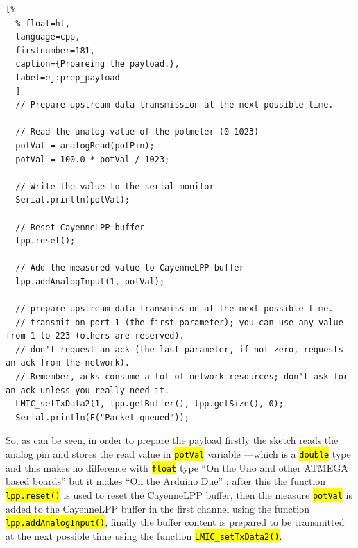 \documentclass[11pt,a4paper,dvipsnames,twoside]{article}
\newcommand{\doubt}[1] {\textbf{\color{Red3}#1}}
\newcommand{\cmd}[1] {\hl{\texttt{#1}}}
\begin{document}
\begin{lstlisting}[%
  % float=ht,
  language=cpp,
  firstnumber=181,
  caption={Prpareing the payload.},
  label=ej:prep_payload
  ]
  // Prepare upstream data transmission at the next possible time.
        
  // Read the analog value of the potmeter (0-1023)
  potVal = analogRead(potPin);
  potVal = 100.0 * potVal / 1023;
  
  // Write the value to the serial monitor
  Serial.println(potVal);
         
  // Reset CayenneLPP buffer
  lpp.reset();

  // Add the measured value to CayenneLPP buffer
  lpp.addAnalogInput(1, potVal);

  // prepare upstream data transmission at the next possible time.
  // transmit on port 1 (the first parameter); you can use any value from 1 to 223 (others are reserved).
  // don't request an ack (the last parameter, if not zero, requests an ack from the network).
  // Remember, acks consume a lot of network resources; don't ask for an ack unless you really need it.
  LMIC_setTxData2(1, lpp.getBuffer(), lpp.getSize(), 0);
  Serial.println(F("Packet queued"));
\end{lstlisting}

So, as can be seen, in order to prepare the payload firstly the sketch reads the analog pin and stores the read value in \cmd{potVal} variable ---which is a \cmd{double} type and this makes no difference with \cmd{float} type \enquote{On the Uno and other ATMEGA based boards} but it makes \enquote{On the Arduino Due} \cite{Ard_double_type}; after this the function \cmd{lpp.reset()} is used to reset the CayenneLPP buffer, then the measure \cmd{potVal} is added to the CayenneLPP buffer in the first channel using the function \cmd{lpp.addAnalogInput()}, finally the buffer content is prepared to be transmitted at the next possible time using the function \cmd{LMIC\_setTxData2()}. 
\end{document}
